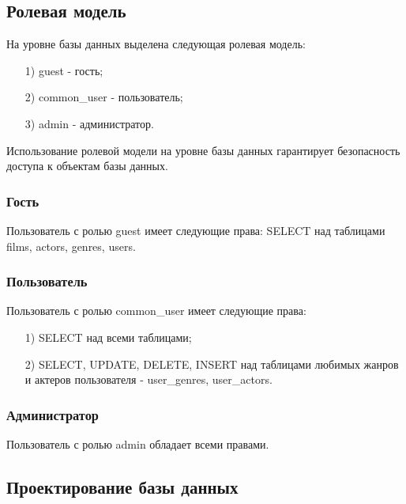 \subsection{Ролевая модель}
На уровне базы данных выделена следующая ролевая модель:
\begin{itemize}
	\item[1)] guest - гость;
	\item[2)] common\_user - пользователь;
	\item[3)] admin - администратор.  
\end{itemize}
Использование ролевой модели на уровне базы данных гарантирует безопасность доступа к объектам базы данных.

\subsubsection{Гость}
Пользователь с ролью guest имеет следующие права: SELECT над таблицами films, actors, genres, users.

\subsubsection{Пользователь}
Пользователь с ролью common\_user имеет следующие права:
\begin{itemize}
	\item[1)] SELECT над всеми таблицами;
	\item[2)] SELECT, UPDATE, DELETE, INSERT над таблицами любимых жанров и
	 актеров пользователя - user\_genres, user\_actors.    
\end{itemize}

\subsubsection{Администратор}
Пользователь с ролью admin обладает всеми правами.

\subsection{Проектирование базы данных}
